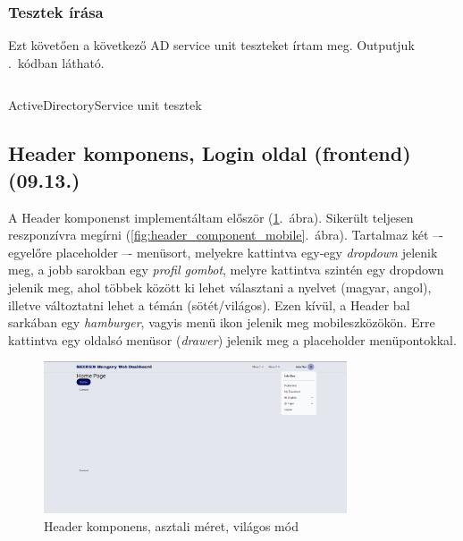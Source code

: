 \documentclass[a4paper]{article}
\begin{document}
\subsubsection*{Tesztek írása}

Ezt követően a következő AD service unit teszteket írtam meg. Outputjuk .~kódban látható.

\begin{listing}[!ht]
\inputminted[bgcolor=codebg, breaklines, breakanywhere, fontsize=\small]{text}{code/activeDirectoryServiceTests.txt}
\caption{ActiveDirectoryService unit tesztek}
\label{listing:active_directory_service_tests}
\end{listing}

\subsection{Header komponens, Login oldal (frontend) (09.13.)}

A Header komponenst implementáltam először (\ref{fig:header_component}.~ábra). Sikerült teljesen
reszponzívra megírni (\ref{fig:header_component_mobile}.~ábra). Tartalmaz
két –- egyelőre placeholder –- menüsort, melyekre kattintva egy-egy \emph{dropdown} jelenik meg, a jobb
sarokban egy \emph{profil gombot}, melyre kattintva szintén egy dropdown jelenik meg, ahol többek között
ki lehet választani a nyelvet (magyar, angol), illetve változtatni lehet a témán (sötét/világos). Ezen
kívül, a Header bal sarkában egy \emph{hamburger}, vagyis menü ikon jelenik meg mobileszközökön. Erre
kattintva egy oldalsó menüsor (\emph{drawer}) jelenik meg a placeholder menüpontokkal.

\begin{figure}[ht]
  \centering
  \includegraphics[width = 0.8\textwidth]{images/header.png}
  \caption{Header komponens, asztali méret, világos mód}
  \label{fig:header_component}
\end{figure}
\begin{center}
\end{center}
\end{document}
